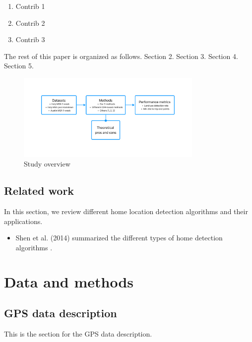 \documentclass[pdflatex,sn-mathphys,lineno]{sn-jnl}%
\theoremstyle{thmstyleone}%
\theoremstyle{thmstyletwo}%
\theoremstyle{thmstylethree}%
\begin{document}
\begin{enumerate}
    \item Contrib 1
    \item Contrib 2
    \item Contrib 3
\end{enumerate}

The rest of this paper is organized as follows. Section 2. Section 3. Section 4. Section 5.

\begin{figure}[ht]
    \centering
    \includegraphics[width=0.8\textwidth]{figures/Study overview.png}
    \caption{Study overview}
    \label{fig:my_label1}
\end{figure}

\subsection{Related work}

In this section, we review different home location detection algorithms and their applications.

\begin{itemize}
    \item Shen et al. (2014) summarized the different types of home detection algorithms \cite{Shen2014}.
\end{itemize}

\section{Data and methods}

\subsection{GPS data description}
This is the section for the GPS data description.
\end{document}
